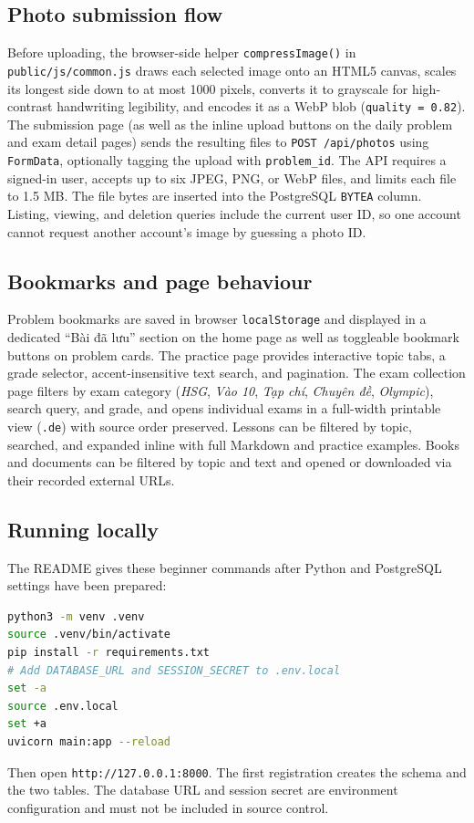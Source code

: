 \subsection{Photo submission flow}
Before uploading, the browser-side helper \texttt{compressImage()} in \texttt{public/js/common.js} draws each selected image onto an HTML5 canvas, scales its longest side down to at most 1000 pixels, converts it to grayscale for high-contrast handwriting legibility, and encodes it as a WebP blob (\texttt{quality = 0.82}). The submission page (as well as the inline upload buttons on the daily problem and exam detail pages) sends the resulting files to \texttt{POST /api/photos} using \texttt{FormData}, optionally tagging the upload with \texttt{problem\_id}. The API requires a signed-in user, accepts up to six JPEG, PNG, or WebP files, and limits each file to 1.5 MB. The file bytes are inserted into the PostgreSQL \texttt{BYTEA} column. Listing, viewing, and deletion queries include the current user ID, so one account cannot request another account's image by guessing a photo ID.

\subsection{Bookmarks and page behaviour}
Problem bookmarks are saved in browser \texttt{localStorage} and displayed in a dedicated ``Bài đã lưu'' section on the home page as well as toggleable bookmark buttons on problem cards. The practice page provides interactive topic tabs, a grade selector, accent-insensitive text search, and pagination. The exam collection page filters by exam category (\textit{HSG}, \textit{Vào 10}, \textit{Tạp chí}, \textit{Chuyên đề}, \textit{Olympic}), search query, and grade, and opens individual exams in a full-width printable view (\texttt{.de}) with source order preserved. Lessons can be filtered by topic, searched, and expanded inline with full Markdown and practice examples. Books and documents can be filtered by topic and text and opened or downloaded via their recorded external URLs.

\subsection{Running locally}
The README gives these beginner commands after Python and PostgreSQL settings have been prepared:
\begin{lstlisting}[language=bash,numbers=none,caption={Install and run on a development computer.}]
python3 -m venv .venv
source .venv/bin/activate
pip install -r requirements.txt
# Add DATABASE_URL and SESSION_SECRET to .env.local
set -a
source .env.local
set +a
uvicorn main:app --reload
\end{lstlisting}
Then open \texttt{http://127.0.0.1:8000}. The first registration creates the schema and the two tables. The database URL and session secret are environment configuration and must not be included in source control.

